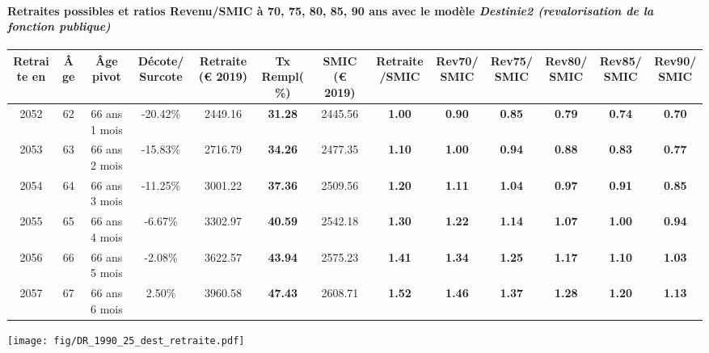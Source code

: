 \paragraph{Retraites possibles et ratios Revenu/SMIC à 70, 75, 80, 85, 90 ans avec le modèle \emph{Destinie2 (revalorisation de la fonction publique)}}  
 
{ \scriptsize \begin{center} 
\begin{tabular}[htb]{|c|c||c|c||c|c||c||c|c|c|c|c|c|} 
\hline 
 Retraite en &  Âge &  Âge pivot &  Décote/Surcote &  Retraite (\euro{} 2019) &  Tx Rempl(\%) &  SMIC (\euro{} 2019) &  Retraite/SMIC &  Rev70/SMIC &  Rev75/SMIC &  Rev80/SMIC &  Rev85/SMIC &  Rev90/SMIC \\ 
\hline \hline 
 2052 &  62 &  66 ans 1 mois &  -20.42\% &  2449.16 &  {\bf 31.28} &  2445.56 &  {\bf 1.00} &  {\bf {\color{red} 0.90}} &  {\bf {\color{red} 0.85}} &  {\bf {\color{red} 0.79}} &  {\bf {\color{red} 0.74}} &  {\bf {\color{red} 0.70}} \\ 
\hline 
 2053 &  63 &  66 ans 2 mois &  -15.83\% &  2716.79 &  {\bf 34.26} &  2477.35 &  {\bf 1.10} &  {\bf 1.00} &  {\bf {\color{red} 0.94}} &  {\bf {\color{red} 0.88}} &  {\bf {\color{red} 0.83}} &  {\bf {\color{red} 0.77}} \\ 
\hline 
 2054 &  64 &  66 ans 3 mois &  -11.25\% &  3001.22 &  {\bf 37.36} &  2509.56 &  {\bf 1.20} &  {\bf 1.11} &  {\bf 1.04} &  {\bf {\color{red} 0.97}} &  {\bf {\color{red} 0.91}} &  {\bf {\color{red} 0.85}} \\ 
\hline 
 2055 &  65 &  66 ans 4 mois &  -6.67\% &  3302.97 &  {\bf 40.59} &  2542.18 &  {\bf 1.30} &  {\bf 1.22} &  {\bf 1.14} &  {\bf 1.07} &  {\bf 1.00} &  {\bf {\color{red} 0.94}} \\ 
\hline 
 2056 &  66 &  66 ans 5 mois &  -2.08\% &  3622.57 &  {\bf 43.94} &  2575.23 &  {\bf 1.41} &  {\bf 1.34} &  {\bf 1.25} &  {\bf 1.17} &  {\bf 1.10} &  {\bf 1.03} \\ 
\hline 
 2057 &  67 &  66 ans 6 mois &  2.50\% &  3960.58 &  {\bf 47.43} &  2608.71 &  {\bf 1.52} &  {\bf 1.46} &  {\bf 1.37} &  {\bf 1.28} &  {\bf 1.20} &  {\bf 1.13} \\ 
\hline 
\hline 
\end{tabular} 
\end{center} } 

 \begin{center}\texttt{[image: fig/DR\_1990\_25\_dest\_retraite.pdf]}\end{center} \label{fig/DR_1990_25_dest_retraite.pdf} 

